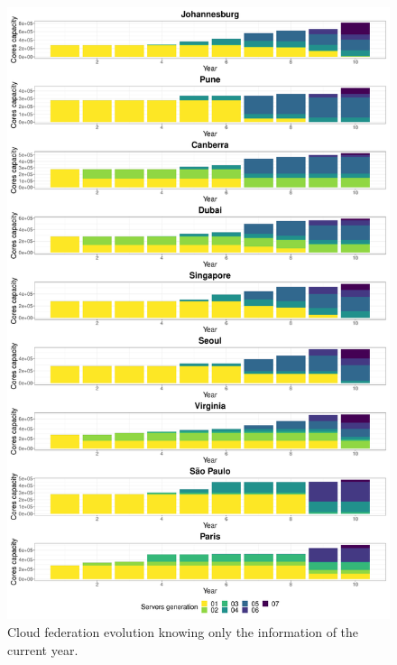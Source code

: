 \begin{figure}
\centering
  
  \includegraphics[width=\linewidth]{images/dc_evolution_year_by_year.pdf}
  \caption{Cloud federation evolution knowing only the information of the current year.}
  \label{fig:dc_evolution_year_by_year}
\end{figure}


